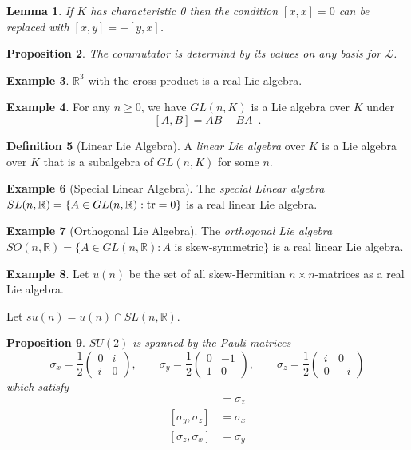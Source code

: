\documentclass{book}
\newtheorem{prop}{Proposition}[chapter]
\newtheorem{lm}[prop]{Lemma}
\theoremstyle{definition}
\newtheorem{df}[prop]{Definition}
\newtheorem{ex}[prop]{Example}
\begin{document}
\begin{lm}
If $K$ has characteristic 0 then the condition $[x,x] = 0$ can be replaced with $[x,y] = -[y,x]$.
\end{lm}


\begin{prop}
The commutator is determind by its values on any basis for $\mathcal{L}$.
\end{prop}


\begin{ex}
$\mathbb{R}^3$ with the cross product is a real Lie algebra.
\end{ex}

\begin{ex}
For any $n \geq 0$, we have $GL(n,K)$ is a Lie algebra over $K$ under
\[ [A,B] = AB - BA \enspace . \]
\end{ex}

\begin{df}[Linear Lie Algebra]
A \emph{linear Lie algebra} over $K$ is a Lie algebra over $K$ that is a subalgebra of $GL(n,K)$ for some $n$.
\end{df}

\begin{ex}[Special Linear Algebra]
The \emph{special Linear algebra}
$SL(n,\mathbb{R}) = \{ A \in GL(n,\mathbb{R}) : \tr A = 0 \}$ is a real linear Lie algebra.
\end{ex}

\begin{ex}[Orthogonal Lie Algebra]
The \emph{orthogonal Lie algebra}
$SO(n,\mathbb{R}) = \{ A \in GL(n,\mathbb{R}) : A \text{ is skew-symmetric} \}$ is a real linear Lie algebra.
\end{ex}

\begin{ex}
Let $u(n)$ be the set of all skew-Hermitian $n \times n$-matrices as a real Lie algebra.

Let $su(n) = u(n) \cap SL(n, \mathbb{R})$.
\end{ex}

\begin{prop}
$SU(2)$ is spanned by the \emph{Pauli matrices}
\[ \sigma_x = \frac{1}{2} \left( \begin{array}{cc}
0 & i \\
i & 0 \end{array} \right), \qquad
\sigma_y = \frac{1}{2} \left( \begin{array}{cc}
0 & -1 \\
1 & 0 \end{array} \right), \qquad
\sigma_z = \frac{1}{2} \left( \begin{array}{cc}
i & 0 \\
0 & -i
\end{array} \right) \]
which satisfy
\begin{align*}
[\sigma_x, \sigma_y] & = \sigma_z \\
[\sigma_y, \sigma_z] & = \sigma_x \\
[\sigma_z, \sigma_x] & = \sigma_y
\end{align*}
\end{prop}
\end{document}
